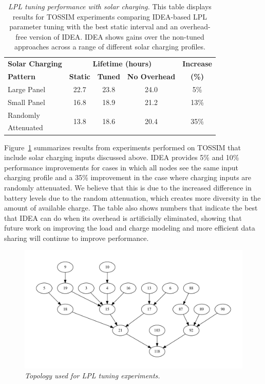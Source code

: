 \begin{table}[t]
\begin{center}
\begin{tabular}{|l|cccc|}
\hline
\textbf{Solar Charging} & \multicolumn{3}{c}{\textbf{Lifetime (hours)}} &
\textbf{Increase} \\
\textbf{Pattern} & \textbf{Static} & \textbf{Tuned} & \textbf{No Overhead} & \textbf{(\%)} \\ \hline
Large Panel & 22.7 & 23.8 & 24.0 & 5\% \\
Small Panel & 16.8 & 18.9 & 21.2 & 13\% \\
Randomly & \multirow{2}{*}{13.8} & \multirow{2}{*}{18.6} & \multirow{2}{*}{20.4} & \multirow{2}{*}{35\%} \\
Attenuated & & & & \\ \hline
\end{tabular}
\end{center}

\caption{\textit{LPL tuning performance with solar charging.} This table
displays results for TOSSIM experiments comparing IDEA-based LPL parameter
tuning with the best static interval and an overhead-free version of IDEA.
IDEA shows gains over the non-tuned approaches across a range of different
solar charging profiles.}

\label{table-lplvoptimaltossim}
\end{table}

Figure~\ref{table-lplvoptimaltossim} summarizes results from experiments
performed on TOSSIM that include solar charging inputs discussed above. IDEA
provides 5\% and 10\% performance improvements for cases in which all nodes
see the same input charging profile and a 35\% improvement in the case where
charging inputs are randomly attenuated. We believe that this is due to the
increased difference in battery levels due to the random attenuation, which
creates more diversity in the amount of available charge. The table also
shows numbers that indicate the best that IDEA can do when its overhead is
artificially eliminated, showing that future work on improving the load and
charge modeling and more efficient data sharing will continue to improve
performance.

\begin{figure}[t]
\begin{center}
\includegraphics[width=\hsize]{./figs/lpltune_topology.pdf}
\end{center}
\caption{\textit{Topology used for LPL tuning experiments.}}
\label{fig-lpltopology}
\end{figure}

